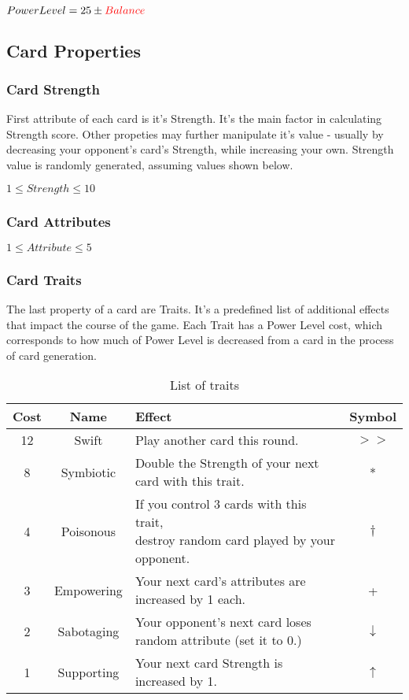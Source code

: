 \documentclass{article}
\begin{document}
    \begin{center}
        $Power Level = 25\pm \textcolor{red}{Balance}$
    \end{center}
    
\subsection{Card Properties}

\subsubsection{Card Strength}

    First attribute of each card is it's Strength. It's the main factor in calculating Strength score. Other propeties may further manipulate it's value - usually by decreasing your opponent's card's Strength, while increasing your own. Strength value is randomly generated, assuming values shown below.

\begin{center}
   $1 \leq Strength \leq 10$   
\end{center}
  
\subsubsection{Card Attributes}

    $1 \leq Attribute \leq 5$
\subsubsection{Card Traits}
    The last property of a card are Traits. It's a predefined list of additional effects that impact the course of the game. Each Trait has a Power Level cost, which corresponds to how much of Power Level is decreased from a card in the process of card generation.
\begin{table}[h]
    \begin{tabular}{ | c | c | l | c |}
        \hline
        Cost & Name & Effect & Symbol\\ \hline
        12 & Swift & Play another card this round. & $>>$ \\  \hline
        8 & Symbiotic & Double the Strength of your next card with this trait. & * \\ \hline
        4 & Poisonous &\pbox{25cm}{If you control 3 cards with this trait, 
        \\destroy random card played by your opponent.}  & $\dagger$ \\  \hline
        3 & Empowering & Your next card's attributes are increased by 1 each. & +\\ \hline
        2 & Sabotaging & Your opponent's next card loses random attribute (set it to 0.) & $\downarrow$ \\ \hline
        1 & Supporting & Your next card Strength is increased by 1.& $\uparrow$ \\ \hline
    \end{tabular}
\caption{List of traits}
\label{tab:traitcost}
\end{table}
\end{document}
